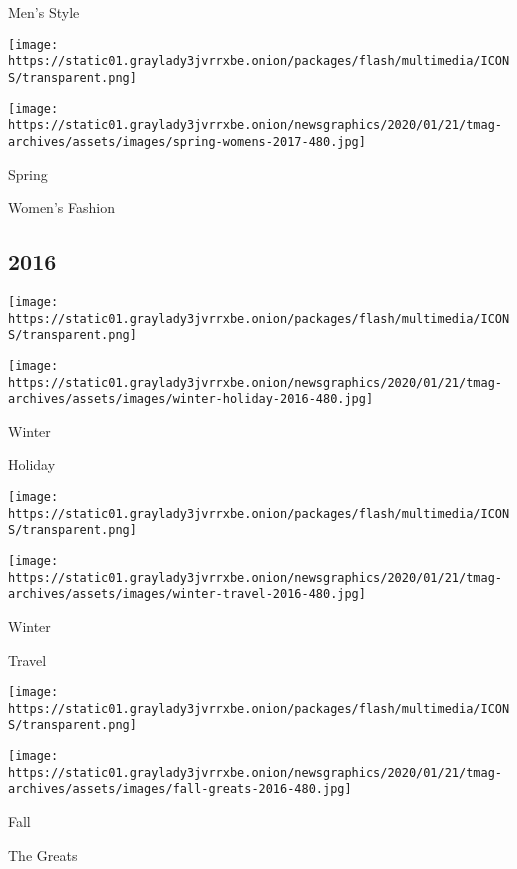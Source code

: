 Men's Style

\href{https://www.nytimes3xbfgragh.onion/issue/t-magazine/2017/02/19/womens-fashion-issue}{}

\texttt{[image: https://static01.graylady3jvrrxbe.onion/packages/flash/multimedia/ICONS/transparent.png]}

\texttt{[image: https://static01.graylady3jvrrxbe.onion/newsgraphics/2020/01/21/tmag-archives/assets/images/spring-womens-2017-480.jpg]}

Spring

Women's Fashion

\hypertarget{2016}{%
\subsection{2016}\label{2016}}

\href{https://www.nytimes3xbfgragh.onion/issue/t-magazine/2016/12/04/Ts-Dec-4-Holiday-Issue}{}

\texttt{[image: https://static01.graylady3jvrrxbe.onion/packages/flash/multimedia/ICONS/transparent.png]}

\texttt{[image: https://static01.graylady3jvrrxbe.onion/newsgraphics/2020/01/21/tmag-archives/assets/images/winter-holiday-2016-480.jpg]}

Winter

Holiday

\href{https://www.nytimes3xbfgragh.onion/issue/t-magazine/2016/11/13/Ts-Nov-13-Travel-Issue}{}

\texttt{[image: https://static01.graylady3jvrrxbe.onion/packages/flash/multimedia/ICONS/transparent.png]}

\texttt{[image: https://static01.graylady3jvrrxbe.onion/newsgraphics/2020/01/21/tmag-archives/assets/images/winter-travel-2016-480.jpg]}

Winter

Travel

\href{https://www.nytimes3xbfgragh.onion/issue/t-magazine/2016/10/23/greats}{}

\texttt{[image: https://static01.graylady3jvrrxbe.onion/packages/flash/multimedia/ICONS/transparent.png]}

\texttt{[image: https://static01.graylady3jvrrxbe.onion/newsgraphics/2020/01/21/tmag-archives/assets/images/fall-greats-2016-480.jpg]}

Fall

The Greats

\href{https://www.nytimes3xbfgragh.onion/issue/t-magazine/2016/09/25/design-luxury}{}

